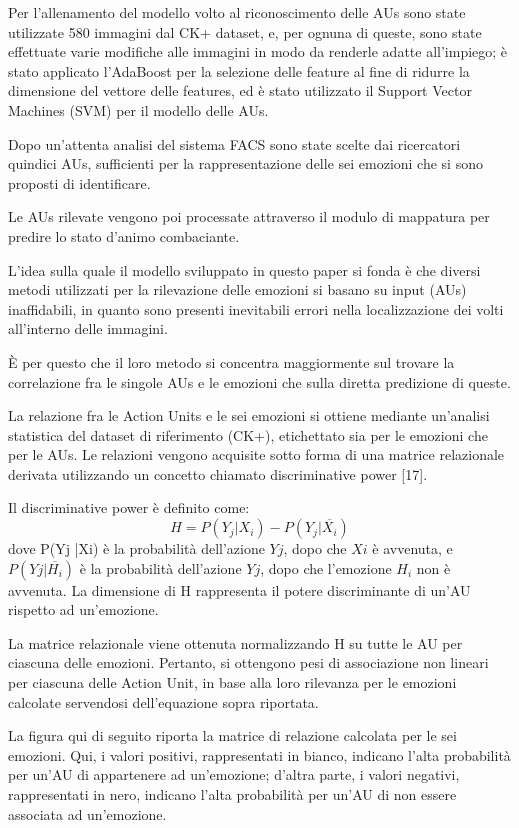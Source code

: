 Per l’allenamento del modello volto al riconoscimento delle AUs sono state utilizzate 580 immagini dal CK+ dataset, e, per ognuna di queste, sono state effettuate varie modifiche alle immagini in modo da renderle adatte all’impiego; è stato applicato l’AdaBoost per la selezione delle feature al fine di ridurre la dimensione del vettore delle features, ed è stato utilizzato il Support Vector Machines (SVM) per il modello delle AUs.

Dopo un’attenta analisi del sistema FACS sono state scelte dai ricercatori quindici AUs, sufficienti per la rappresentazione delle sei emozioni che si sono proposti di identificare.

Le AUs rilevate vengono poi processate attraverso il modulo di mappatura per predire lo stato d’animo combaciante.

L’idea sulla quale il modello sviluppato in questo paper si fonda è che diversi metodi utilizzati per la rilevazione delle emozioni si basano su input (AUs) inaffidabili, in quanto sono presenti inevitabili errori nella localizzazione dei volti all’interno delle immagini.

È per questo che il loro metodo si concentra maggiormente sul trovare la correlazione fra le singole AUs e le emozioni che sulla diretta predizione di queste.

La relazione fra le Action Units e le sei emozioni si ottiene mediante un'analisi statistica del dataset di riferimento (CK+), etichettato sia per le emozioni che per le AUs. Le relazioni vengono acquisite sotto forma di una matrice relazionale derivata utilizzando un concetto chiamato discriminative power [17]. 

Il discriminative power è definito come:
\[
H = P(Y_j|X_i) - P(Y_j|\overline{X_i})
\]
dove P(Yj |Xi) è la probabilità dell'azione $Yj$, dopo che $Xi$ è avvenuta, e $P(Yj | \overline{H_i})$ è la probabilità dell'azione $Yj$, dopo che l'emozione $H_i$ non è avvenuta. La dimensione di H rappresenta il potere discriminante di un'AU rispetto ad un'emozione.

La matrice relazionale viene ottenuta normalizzando H su tutte le AU per ciascuna delle emozioni. Pertanto, si ottengono pesi di associazione non lineari per ciascuna delle Action Unit, in base alla loro rilevanza per le emozioni calcolate servendosi dell'equazione sopra riportata.

La figura qui di seguito riporta la matrice di relazione calcolata per le sei emozioni. Qui, i valori positivi, rappresentati in bianco, indicano l'alta probabilità per un'AU di appartenere ad un'emozione; d’altra parte, i valori negativi, rappresentati in nero, indicano l'alta probabilità per un'AU di non essere associata ad un'emozione. 

